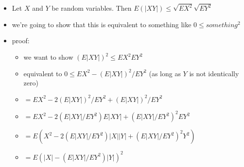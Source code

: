 \begin{itemize}
\item Let $X$ and $Y$ be random variables.  Then $E (|X Y|) \leq
          \sqrt{E X^2} \sqrt{E Y^2}$
\item we're going to show that this is equivalent to something
          like $0 \leq something^2$
\item proof:
\begin{itemize}
\item we want to show $(E |XY|)^2 \leq E X^2 E Y^2$
\item equivalent to $0 \leq E X^2 - (E |X Y|)^2 / E Y^2$ (as long
            as $Y$ is not identically zero)
\item $= E X^2 - 2 (E |XY|)^2/EY^2 + (E |XY|)^2/EY^2$
\item $= E X^2 - 2(E |XY| / E Y^2) E |XY| + (E |XY|/EY^2)^2 E Y^2$
\item $= E(X^2 - 2(E |XY| / E Y^2) |X| |Y| + (E |XY|/EY^2)^2 Y^2)$
\item $= E(|X| - (E |XY|/E Y^2) |Y|)^2$
\end{itemize}
\end{itemize}

